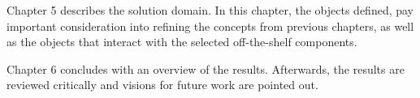 \noindent Chapter 5 describes the solution domain. In this chapter, the objects defined, pay important consideration into refining the concepts from previous chapters, as well as the objects that interact with the selected off-the-shelf components. \\

  \vspace{1mm}

\noindent  Chapter 6 concludes with an overview of the results. Afterwards, the results are reviewed critically and visions for future work are pointed out. \\
			
